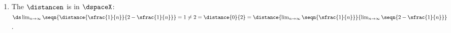 \begin{example}
\begin{enumerate}
  \item The  $\distancen$ is  in $\dspaceX$:
    \\\indentx$\ds
      \lim_{n\to\infty}\seqn{\distance{\sfrac{1}{n}}{2-\sfrac{1}{n}}}
        = 1 \neq 2 = \distance{0}{2}
      = \distance{\lim_{n\to\infty}\seqn{\sfrac{1}{n}}}{\lim_{n\to\infty}\seqn{2-\sfrac{1}{n}}}
     $.
\end{enumerate}
\end{example}

